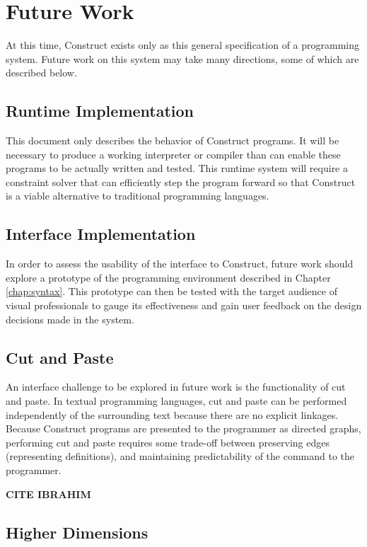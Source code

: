 \documentclass[twoside,11pt]{report}
\begin{document}
\section{Future Work}

At this time, Construct exists only as this general specification of a programming system. 
Future work on this system may take many directions, some of which are described below.

\subsection{Runtime Implementation}

This document only describes the behavior of Construct programs. 
It will be necessary to produce a working interpreter or compiler than can enable these programs to be actually written and tested. 
This runtime system will require a constraint solver that can efficiently step the program forward so that Construct is a viable alternative to traditional programming languages.

\subsection{Interface Implementation}

In order to assess the usability of the interface to Construct, future work should explore a prototype of the programming environment described in Chapter \ref{chap:syntax}.
This prototype can then be tested with the target audience of visual professionals to gauge its effectiveness and gain user feedback on the design decisions made in the system.

\subsection{Cut and Paste}

An interface challenge to be explored in future work is the functionality of cut and paste. 
In textual programming languages, cut and paste can be performed independently of the surrounding text because there are no explicit linkages.
Because Construct programs are presented to the programmer as directed graphs, performing cut and paste requires some trade-off between preserving edges (representing definitions), and maintaining predictability of the command to the programmer.

{\bf CITE IBRAHIM}

\subsection{Higher Dimensions}
\end{document}
